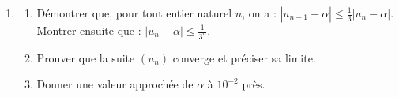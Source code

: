 \begin{exo}
\begin{description}
\begin{enumerate}
                              Montrer, en utilisant la variation de $f$, que cette suite est bien d\'efinie et que,
                              pour tout entier naturel $n$, on a : $0 \leq u_n \leq 1$.
                        \item \begin{enumerate}
                                    \item D\'emontrer que, pour tout entier naturel $n$, on a :
                                          $| u_{n+1} - \alpha | \leq \frac{1}{3} |u_n - \alpha|$.
                                          Montrer ensuite que : 
                                          $|u_n - \alpha | \leq \frac{1}{3^n}$.
                                    \item Prouver que la suite $(u_n)$ converge et pr\'eciser sa limite.
                                    \item Donner une valeur approch\'ee de $\alpha$ \`a $10^{-2}$ pr\`es.
                              \end{enumerate}
                  \end{enumerate}
      \end{description}
\end{exo}
%
